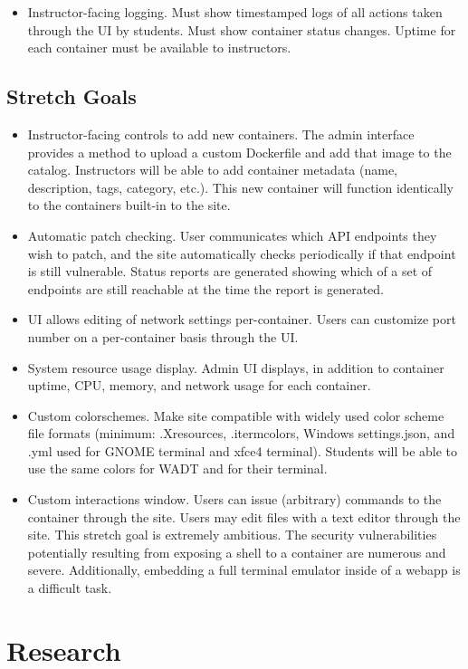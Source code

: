 \documentclass[12pt]{article}
\begin{document}
\begin{itemize}
	\item Instructor-facing logging. Must show timestamped logs of all actions taken through the UI by students. Must show container status changes. Uptime for each container must be available to instructors.
\end{itemize}

\subsection{Stretch Goals}
\begin{itemize}
	\item Instructor-facing controls to add new containers. The admin interface provides a method to upload a custom Dockerfile and add that image to the catalog. Instructors will be able to add container metadata (name, description, tags, category, etc.). This new container will function identically to the containers built-in to the site.
	\item Automatic patch checking. User communicates which API endpoints they wish to patch, and the site automatically checks periodically if that endpoint is still vulnerable. Status reports are generated showing which of a set of endpoints are still reachable at the time the report is generated.
	\item UI allows editing of network settings per-container. Users can customize port number on a per-container basis through the UI.
	\item System resource usage display. Admin UI displays, in addition to container uptime, CPU, memory, and network usage for each container.
	\item Custom colorschemes.
	      Make site compatible with widely used color scheme file formats (minimum: .Xresources, .itermcolors, Windows settings.json, and .yml used for GNOME terminal and xfce4 terminal). Students will be able to use the same colors for WADT and for their terminal.
	\item Custom interactions window. Users can issue (arbitrary) commands to the container through the site. Users may edit files with a text editor through the site. This stretch goal is extremely ambitious. The security vulnerabilities potentially resulting from exposing a shell to a container are numerous and severe. Additionally, embedding a full terminal emulator inside of a webapp is a difficult task.
\end{itemize}

\section{Research}
\end{document}
